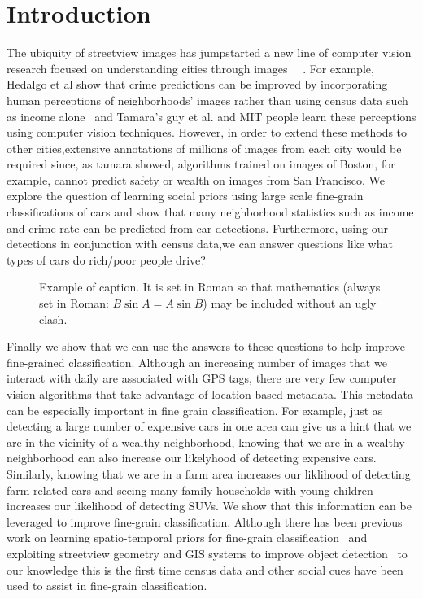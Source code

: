 \documentclass[10pt,twocolumn,letterpaper]{article}
\begin{document}
\section{Introduction}
The ubiquity of streetview images has jumpstarted a new line of computer vision research focused on understanding cities through images \cite{mit_plos_1}~\cite{MIT_vision}~\cite{tamara}. For example, Hedalgo et al show that crime predictions can be improved by incorporating human perceptions of neighborhoods' images rather than using census data such as income alone~\cite{mit_plos_1} and Tamara's guy et al. and MIT people learn these perceptions using computer vision techniques. However, in order to extend these methods to other cities,extensive annotations of millions of images from each city would be required since, as tamara showed, algorithms trained on images of Boston, for example, cannot predict safety or wealth on images from San Francisco.  We explore the question of learning social priors using large scale fine-grain classifications of cars and show that many neighborhood statistics such as income and crime rate can be predicted from car detections. Furthermore, using our detections in conjunction with census data,we can answer questions like what types of cars do rich/poor people drive? 

\begin{figure}[t]
\begin{center}
\fbox{\rule{0pt}{2in} \rule{0.9\linewidth}{0pt}}
\end{center}
   \caption{Example of caption.  It is set in Roman so that mathematics
   (always set in Roman: $B \sin A = A \sin B$) may be included without an
   ugly clash.}
\label{fig:pull}
\end{figure}

Finally we show that we can use the answers to these questions to help improve fine-grained classification. Although an increasing number of images that we interact with daily are associated with GPS tags, there are very few computer vision algorithms that take advantage of location based metadata. This metadata can be especially important in fine grain classification. For example, just as detecting a large number of expensive cars in one area can give us a hint that we are in the vicinity of a wealthy neighborhood, knowing that we are in a wealthy neighborhood can also increase our likelyhood of detecting expensive cars. Similarly, knowing that we are in a farm area increases our liklihood of detecting farm related cars and seeing many family households with young children increases our likelihood of detecting SUVs. We show that this information can be leveraged to improve fine-grain classification. Although there has been previous work on learning spatio-temporal priors for fine-grain classification~\cite{birdsnap} and exploiting streetview geometry and GIS systems to improve object detection~\cite{nyc3D,amir} to our knowledge this is the first time census data and other social cues have been used to assist in fine-grain classification.  
\end{document}
